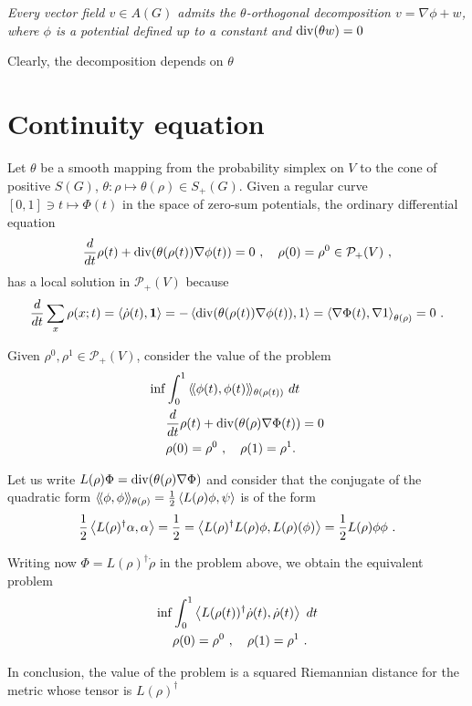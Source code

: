 \documentclass[12pt,a4paper]{amsart}
\begin{document}
\emph{Every vector field $v \in A(G)$ admits the $\theta$-orthogonal
  decomposition $v = \nabla \phi + w$, where $\phi$ is a potential
  defined up to a constant and $\Div(\theta w) = 0$}

Clearly, the decomposition depends on $\theta$

\section{Continuity equation}
\label{sec:continuity}

Let $\theta$ be a smooth mapping from the probability simplex on $V$ to the
cone of positive $S(G)$, $\theta \colon \rho \mapsto \theta(\rho) \in
S_+(G)$. Given a regular curve $[0,1] \ni t \mapsto \Phi(t)$ in the
space of zero-sum potentials, the ordinary differential equation
\begin{equation*}
  \derivby t \rho(t) +  \Div(\theta(\rho(t))\nabla \phi(t)) = 0 \ , \quad
  \rho(0) = \rho^0 \in \mathcal P_+(V) \ ,
\end{equation*}
has a local solution in $\mathcal P_+(V)$ because
\begin{equation*}
  \derivby t \sum_x \rho(x;t) = \scalarof {\dot \rho(t)}{\one} = 
 - \scalarof {\Div(\theta(\rho(t))\nabla \phi(t))}{1} = \scalarat
 {\theta(\rho)} {\nabla \Phi(t)}{\nabla 1}
 = 0 \ .
\end{equation*}

Given $\rho^0, \rho^1 \in \mathcal P_+(V)$, consider the value of the problem
\begin{align*}
 \inf &\int_0^1 \Scalarat {\theta(\rho(t))} {\phi(t)}{\phi(t)} \ dt
 \\
 &\derivby t \rho(t) +  \Div(\theta(\rho)\nabla \Phi(t)) = 0 \\
 &\rho(0) = \rho^0 \ , \quad \rho(1) = \rho^1.
\end{align*}

Let us write $L(\rho)\Phi = \Div(\theta(\rho)\nabla \Phi)$ and
consider that the conjugate of the quadratic form
$\Scalarat {\theta(\rho)} \phi \phi = \frac 12 \scalarof {L(\rho)\phi}
\psi$ is of the form
\begin{equation*}
  \frac 12 \scalarof {L(\rho)^\dagger \alpha} {\alpha} = \frac12 =
  \scalarof {L(\rho)^\dagger L(\rho) \phi} {L(\rho)(\phi)} = \frac12
  {L(\rho) \phi} \phi \ . 
\end{equation*}

Writing now $\Phi = L(\rho)^\dagger \dot \rho$ in the problem above,
we obtain the equivalent problem
\begin{align*}
 \inf &\int_0^1 \scalarof {L(\rho(t))^\dagger \dot \rho(t)}{\dot \rho(t)} \ dt
 \\
 &\rho(0) = \rho^0 \ , \quad \rho(1) = \rho^1 \ .
\end{align*}

In conclusion, the value of the problem is a squared Riemannian
distance for the metric whose tensor is $L(\rho)^\dagger$
\end{document}
